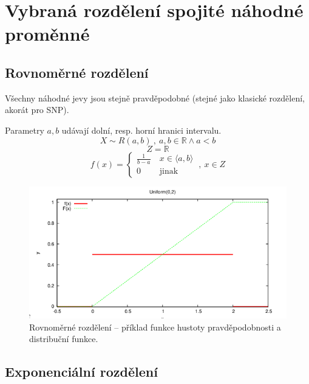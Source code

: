 
\section{Vybraná rozdělení spojité náhodné proměnné}

\subsection{Rovnoměrné rozdělení}

\begin{compactitem}
    \item Všechny náhodné jevy jsou stejně pravděpodobné (stejné jako klasické rozdělení, akorát pro SNP).
    \item Parametry $a, b$ udávají dolní, resp. horní hranici intervalu.
    $$ X \sim R(a, b) ~,~ a, b \in \mathbb{R} \land a < b $$
    $$ Z = \mathbb{R} $$
    $$ f(x) = \left\{
        \begin{array}{ll}
            \frac{1}{b-a} ~ & x \in \langle a, b \rangle \\
            0             ~ & \text{jinak}
        \end{array}
        \right. ~,~ x \in Z
    $$
\end{compactitem}

\begin{figure}[H]
    \centering
    \includegraphics[width=1\linewidth]{snp_rovnomerne.png}
    \caption{Rovnoměrné rozdělení -- příklad funkce hustoty pravděpodobnosti a distribuční funkce.}
\end{figure}

\subsection{Exponenciální rozdělení}

